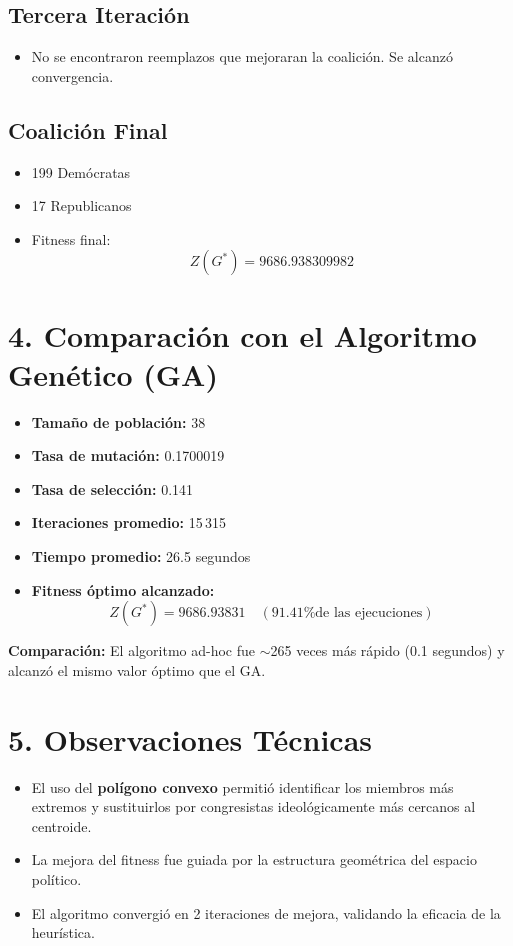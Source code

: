\documentclass[12pt]{article}
\begin{document}
\subsection*{Tercera Iteración}
\begin{itemize}
    \item No se encontraron reemplazos que mejoraran la coalición. Se alcanzó convergencia.
\end{itemize}

\subsection*{Coalición Final}
\begin{itemize}
    \item 199 Demócratas
    \item 17 Republicanos
    \item Fitness final:
    \[
    Z(G^*) = 9686.938309982
    \]
\end{itemize}

\section*{4. Comparación con el Algoritmo Genético (GA)}

\begin{itemize}
    \item \textbf{Tamaño de población:} 38
    \item \textbf{Tasa de mutación:} 0.1700019
    \item \textbf{Tasa de selección:} 0.141
    \item \textbf{Iteraciones promedio:} 15\,315
    \item \textbf{Tiempo promedio:} 26.5 segundos
    \item \textbf{Fitness óptimo alcanzado:}
    \[
    Z(G^*) = 9686.93831 \quad (\text{91.41\% de las ejecuciones})
    \]
\end{itemize}

\textbf{Comparación:} El algoritmo ad-hoc fue $\sim$265 veces más rápido (0.1 segundos) y alcanzó el mismo valor óptimo que el GA.

\section*{5. Observaciones Técnicas}

\begin{itemize}
    \item El uso del \textbf{polígono convexo} permitió identificar los miembros más extremos y sustituirlos por congresistas ideológicamente más cercanos al centroide.
    \item La mejora del fitness fue guiada por la estructura geométrica del espacio político.
    \item El algoritmo convergió en 2 iteraciones de mejora, validando la eficacia de la heurística.
\end{itemize}
\end{document}
